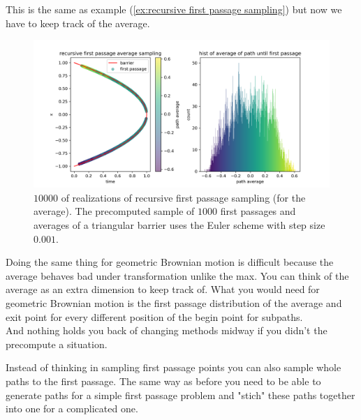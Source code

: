 \documentclass[a4paper,12pt]{article}
\begin{document}
\begin{example}
    This is the same as example (\ref{ex:recursive first passage sampling}) but now we have
    to keep track of the average.

    \begin{figure}[ht!]
        \centering
        \includegraphics[width=1\textwidth]{plots/recursive first passage average para.png}
        \caption{ $10000$ of realizations of recursive first passage sampling (for the average).
            The precomputed sample of $1000$ first passages and averages of a triangular barrier
            uses the Euler scheme with step size $0.001$.}
        \label{fig:recursive first passage average para}
    \end{figure}
\end{example}

Doing the same thing for geometric Brownian motion is difficult because the average
behaves bad under transformation unlike the max. You can think of the average
as an extra dimension to keep track of. What you would need  for geometric
Brownian motion is the  first passage distribution of the average and exit
point for every different position of the begin point for subpaths.\\
And nothing holds you back of changing methods midway if you didn't
the precompute a situation.

\begin{technique}
    Instead of thinking in sampling first passage points you can also sample
    whole paths to the first passage. The same way as before you need to be
    able to generate paths for a simple first passage problem and "stich"
    these paths together into one for a complicated one.
\end{technique}
\end{document}
